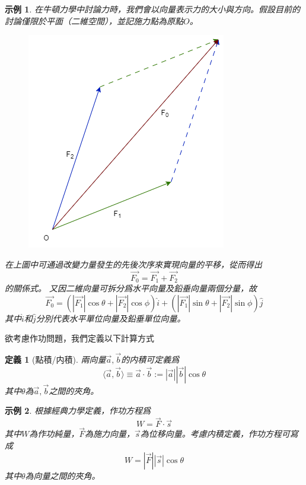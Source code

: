 \documentclass[12pt]{article}
\newcommand{\innerprod}[2]{\langle{#1},{#2}\rangle}
\newtheorem{definition}{定義}
\newtheorem*{example}{示例}
\begin{document}
    \begin{example}
        在牛頓力學中討論力時，我們會以向量表示力的大小與方向。假設目前的討論僅限於平面（二維空間），並記施力點為原點$O$。
        \begin{figure}[H]
            \centering
            \includegraphics[scale=0.6]{Force.png}
        \end{figure}
        在上圖中可通過改變力量發生的先後次序來實現向量的平移，從而得出$$\vec{F_0}=\vec{F_1}+\vec{F_2}$$的關係式。
        又因二維向量可拆分爲水平向量及鉛垂向量兩個分量，故$$\vec{F_0}=(|\vec{F_1}|\cos{\theta}+|\vec{F_2}|\cos{\phi})\hat{i}+(|\vec{F_1}|\sin{\theta}+|\vec{F_2}|\sin{\phi})\hat{j}$$其中$\hat{i}$和$\hat{j}$分別代表水平單位向量及鉛垂單位向量。
    \end{example}

    欲考慮作功問題，我們定義以下計算方式

    \begin{definition}[點積/内積]
        兩向量$\vec{a},\vec{b}$的内積可定義爲$$\innerprod{\vec{a}}{\vec{b}}\equiv \vec{a}\cdot\vec{b}:=|\vec{a}||\vec{b}|\cos{\theta}$$其中$\theta$為$\vec{a},\vec{b}$之間的夾角。
    \end{definition}

    \begin{example}
        根據經典力學定義，作功方程爲$$W=\vec{F}\cdot\vec{s}$$其中$W$為作功純量，$\vec{F}$為施力向量，$\vec{s}$為位移向量。考慮内積定義，作功方程可寫成$$W=|\vec{F}||\vec{s}|\cos{\theta}$$其中$\theta$為向量之間的夾角。
    \end{example}
\end{document}
